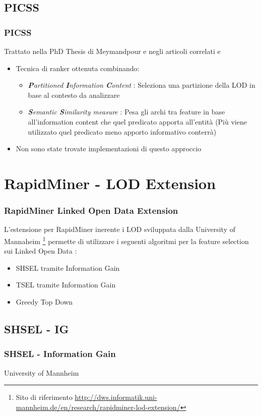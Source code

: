 \documentclass{beamer}
\begin{document}
\subsection{PICSS}
\begin{frame}
	\frametitle{PICSS}
	Trattato nella PhD Thesis di Meymandpour e negli articoli correlati \cite{Meymandpour_ESWC_2014} e \cite{MeymandpourD13}
	\begin{itemize}
		\item Tecnica di ranker ottenuta combinando:
		\begin{itemize}
			\item \emph{\textbf{P}artitioned \textbf{I}nformation \textbf{C}ontent} : Seleziona una partizione della LOD in base al contesto da analizzare
			\item \emph{\textbf{S}emantic \textbf{S}imilarity measure} : Pesa gli archi tra feature in base all'information content che quel predicato apporta all'entità (Più viene utilizzato quel predicato meno apporto informativo conterrà)
		\end{itemize}
		\item Non sono state trovate implementazioni di questo approccio
	\end{itemize}
\end{frame}
\section{RapidMiner - LOD Extension}
\begin{frame}
	\frametitle{RapidMiner Linked Open Data Extension}
	L'estensione per RapidMiner inerente i LOD sviluppata dalla University of Mannaheim \footnote{Sito di riferimento \url{http://dws.informatik.uni-mannheim.de/en/research/rapidminer-lod-extension/}} permette di utilizzare i seguenti algoritmi per la feature selection sui Linked Open Data :
	\begin{itemize}
		\item SHSEL tramite Information Gain
		\item TSEL tramite Information Gain
		\item Greedy Top Down
	\end{itemize}
\end{frame}
\subsection{SHSEL - IG}
\begin{frame}
	\frametitle{SHSEL - Information Gain}
	University of Mannheim
\end{frame}
\end{document}
